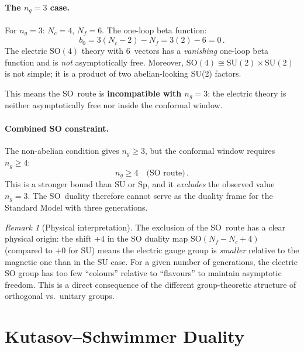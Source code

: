 \documentclass[11pt,a4paper]{article}
\theoremstyle{plain}
\theoremstyle{definition}
\theoremstyle{remark}
\newtheorem{remark}[theorem]{Remark}
\newcommand{\Nc}{N_{\!c}}
\newcommand{\Nf}{N_{\!f}}
\newcommand{\ngen}{n_g}
\newcommand{\SU}[1]{\mathrm{SU}(#1)}
\newcommand{\SO}[1]{\mathrm{SO}(#1)}
\begin{document}
\paragraph{The $\ngen = 3$ case.}
For $\ngen = 3$: $\Nc = 4$, $\Nf = 6$.  The one-loop beta function:
\begin{equation}
  b_0 = 3(\Nc - 2) - \Nf = 3(2) - 6 = 0\,.
\end{equation}
The electric $\SO{4}$ theory with 6~vectors has a \emph{vanishing}
one-loop beta function and is \emph{not} asymptotically free.  Moreover,
$\SO{4} \cong \SU{2} \times \SU{2}$ is not simple; it is a product of
two abelian-looking SU(2) factors.

This means the SO~route is \textbf{incompatible with $\ngen = 3$}: the
electric theory is neither asymptotically free nor inside the conformal
window.

\paragraph{Combined SO constraint.}
The non-abelian condition gives $\ngen \geq 3$, but the conformal window
requires $\ngen \geq 4$:
\begin{equation}\label{eq:SO-combined}
  \boxed{\ngen \geq 4 \quad\text{(SO route)}}\,.
\end{equation}
This is a stronger bound than SU or Sp, and it \emph{excludes} the
observed value $\ngen = 3$.  The SO~duality therefore cannot serve as the
duality frame for the Standard Model with three generations.

\begin{remark}[Physical interpretation]
\label{rem:SO-exclusion}
The exclusion of the SO~route has a clear physical origin: the shift
$+4$ in the SO duality map $\SO{\Nf - \Nc + 4}$ (compared to $+0$ for
SU) means the electric gauge group is \emph{smaller} relative to the
magnetic one than in the SU case.  For a given number of generations,
the electric SO group has too few ``colours'' relative to ``flavours''
to maintain asymptotic freedom.  This is a direct consequence of the
different group-theoretic structure of orthogonal vs.\ unitary groups.
\end{remark}


\section{Kutasov--Schwimmer Duality}
\label{sec:KS-duality}
\end{document}
